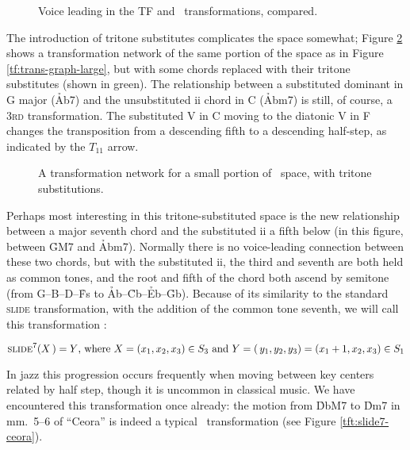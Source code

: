 \begin{figure}[htbp]
  \caption{Voice leading in the TF and \tft\ transformations, compared.}
  \label{tft:voice-leading-tft}
\end{figure}

The introduction of tritone substitutes complicates the space somewhat; Figure
\ref{tft:tft-space-extract} shows a transformation network of the same portion
of the space as in Figure \ref{tf:trans-graph-large}, but with some chords
replaced with their tritone substitutes (shown in green). The relationship
between a substituted dominant in G major (\h{Ab7}) and the unsubstituted ii
chord in C (\h{Abm7}) is still, of course, a \textsc{3rd} transformation. The
substituted V in C moving to the diatonic V in F changes the
transposition from a descending fifth to a descending half-step, as indicated
by the $T_{11}$ arrow.

\begin{figure}[tbp]
  \caption{A transformation network for a small portion of \tf\ space, with
    tritone substitutions.}
  \label{tft:tft-space-extract}
\end{figure}

Perhaps most interesting in this tritone-substituted space is the new
relationship between a major seventh chord and the substituted ii a
fifth below (in this figure, between \h{GM7} and \h{Abm7}). Normally there is
no voice-leading connection between these two chords, but with the substituted
ii, the third and seventh are both held as common tones, and the root
and fifth of the chord both ascend by semitone (from G--B--D--\h{Fs} to
\h{Ab}--\h{Cb}--\h{Eb}--\h{Gb}). Because of its similarity to the
standard \textsc{slide} transformation, with the addition of the common tone
seventh, we will call this transformation \slideS:

\vspace{-3em}
\begin{displaymath}
    \text{\textsc{slide}\textsuperscript{7}}(X\,) = Y\text{, where}\ X = (x_1, x_2, x_3) \in S_3
     \text{ and}\
    Y = (\,y_1, y_2, y_3) = (x_1 + 1, x_2, x_3) \in S_1
\end{displaymath}
\vspace{-3em}

\noindent In jazz this progression occurs frequently when moving between key
centers related by half step, though it is uncommon in classical
music.\fn{tft-4} We have encountered this transformation once already: the
motion from \h{DbM7} to \h{Dm7} in mm.~5--6 of ``Ceora'' is indeed a typical
\slideS\ transformation (see Figure \ref{tft:slide7-ceora}).

